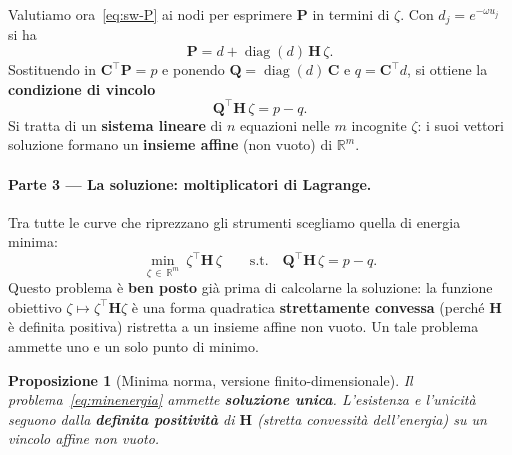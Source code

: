 \documentclass[11pt,a4paper]{article}
\theoremstyle{plain}
\newtheorem{proposizione}[teorema]{Proposizione}
\theoremstyle{definition}
\theoremstyle{remark}
\newcommand{\Qmat}{\mathbf{Q}}
\newcommand{\Hmat}{\mathbf{H}}
\newcommand{\transp}{^{\!\top}}
\begin{document}
Valutiamo ora~\eqref{eq:sw-P} ai nodi per esprimere $\mathbf{P}$ in termini di $\zeta$.
Con $d_j = e^{-\omega u_j}$ si ha
\[
  \mathbf{P} = d + \operatorname{diag}(d)\,\Hmat\,\zeta .
\]
Sostituendo in $\mathbf{C}\transp \mathbf{P} = p$ e ponendo
$\Qmat = \operatorname{diag}(d)\,\mathbf{C}$ e $q = \mathbf{C}\transp d$, si ottiene la
\textbf{condizione di vincolo}
\begin{equation}
  \Qmat\transp \Hmat\, \zeta = p - q .
  \label{eq:vincolo}
\end{equation}
Si tratta di un \textbf{sistema lineare} di $n$ equazioni nelle $m$ incognite $\zeta$:
i suoi vettori soluzione formano un \textbf{insieme affine} (non vuoto) di $\mathbb{R}^m$.

\paragraph{Parte 3 --- La soluzione: moltiplicatori di Lagrange.}
Tra tutte le curve che riprezzano gli strumenti scegliamo quella di energia minima:
\begin{equation}
  \min_{\zeta\,\in\,\mathbb{R}^m} \ \zeta\transp \Hmat\, \zeta
  \qquad \text{s.t.}\quad
  \Qmat\transp \Hmat\, \zeta = p - q .
  \label{eq:minenergia}
\end{equation}
Questo problema \`e \textbf{ben posto} gi\`a prima di calcolarne la soluzione: la funzione
obiettivo $\zeta\mapsto\zeta\transp\Hmat\zeta$ \`e una forma quadratica
\textbf{strettamente convessa} (perch\'e $\Hmat$ \`e definita positiva) ristretta a un
insieme affine non vuoto. Un tale problema ammette uno e un solo punto di minimo.

\begin{proposizione}[Minima norma, versione finito-dimensionale]
\label{prop:minnorm-finita}
Il problema~\eqref{eq:minenergia} ammette \textbf{soluzione unica}. L'esistenza e
l'unicit\`a seguono dalla \textbf{definita positivit\`a} di $\Hmat$ (stretta
convessit\`a dell'energia) su un vincolo affine non vuoto.
\end{proposizione}
\end{document}
